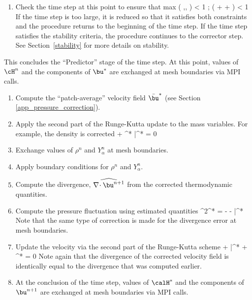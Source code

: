 \begin{enumerate}
\item Check the time step at this point to ensure that
\be \dt \; \hbox{max} \left( ,, \right) < 1 \quad ;  \; \dt \; \nu \; \left( +  +  \right) < 1 \ee
If the time step is too large, it is reduced so that it satisfies both constraints and the procedure returns to the beginning of the time step. If
the time step satisfies the stability criteria, the procedure continues to the corrector step. See Section~\ref{stability} for more details on
stability.
\end{enumerate}

\noindent This concludes the ``Predictor'' stage of the time step.  At this point, values of $\cH^n$ and the components of $\bu^*$ are exchanged at
mesh boundaries via MPI calls.

\begin{enumerate}
\item Compute the ``patch-average'' velocity field $\bar{\bu}^*$ (see Section \ref{app_pressure_correction}).

\item Apply the second part of the Runge-Kutta update to the mass variables. For example, the density is corrected
\be {} +  \nabla\!\cdot \rho^* \bar{\bu}^* = 0 \ee

\item Exchange values of $\rho^n$ and $Y_\alpha^n$ at mesh boundaries.

\item Apply boundary conditions for $\rho^n$ and $Y_\alpha^n$.

\item Compute the divergence, $\widehat{\nabla\!\cdot \bu^{n+1}}$ from the corrected thermodynamic quantities.

\item Compute the pressure fluctuation using estimated quantities
\be \label{eqn_corrector_poisson2} \nabla^2\calH^* = - 
   - \nabla\!\cdot \bar{}^*
\ee Note that the same type of correction is made for the divergence error at mesh boundaries.

\item Update the velocity via the second part of the Runge-Kutta scheme
\be {} + \bar{}^* + \nabla \calH^*  = 0 \ee Note again that the
divergence of the corrected velocity field is identically equal to the divergence that was computed earlier.

\item At the conclusion of the time step, values of $\calH^*$ and the components of $\bu^{n+1}$ are exchanged at mesh boundaries via MPI calls.

\end{enumerate}
